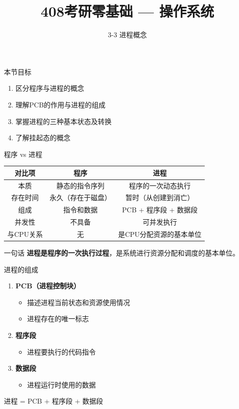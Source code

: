 \documentclass[10pt, aspectratio=169]{beamer}
\title{408考研零基础 --- 操作系统}
\subtitle{3-3 进程概念}
\author{}
\date{}
\begin{document}
\begin{frame}{本节目标}
    \begin{enumerate}
        \item 区分程序与进程的概念
        \item 理解PCB的作用与进程的组成
        \item 掌握进程的三种基本状态及转换
        \item 了解挂起态的概念
    \end{enumerate}
\end{frame}

\begin{frame}{程序 vs 进程}
    \begin{tabular}{|c|c|c|}
        \hline
        对比项 & 程序 & 进程 \\
        \hline
        本质 & 静态的指令序列 & 程序的一次动态执行 \\
        存在时间 & 永久（存在于磁盘） & 暂时（从创建到消亡） \\
        组成 & 指令和数据 & PCB + 程序段 + 数据段 \\
        并发性 & 不具备 & 可并发执行 \\
        与CPU关系 & 无 & 是CPU分配资源的基本单位 \\
        \hline
    \end{tabular}
    \vspace{0.5em}
    \begin{block}{一句话}
        \textbf{进程是程序的一次执行过程}，是系统进行资源分配和调度的基本单位。
    \end{block}
\end{frame}

\begin{frame}{进程的组成}
    \begin{enumerate}
        \item \textbf{PCB（进程控制块）}
        \begin{itemize}
            \item 描述进程当前状态和资源使用情况
            \item \textcolor{408orange}{进程存在的唯一标志}
        \end{itemize}
        \item \textbf{程序段}
        \begin{itemize}
            \item 进程要执行的代码指令
        \end{itemize}
        \item \textbf{数据段}
        \begin{itemize}
            \item 进程运行时使用的数据
        \end{itemize}
    \end{enumerate}
    \vspace{0.5em}
    \begin{center}
        进程 = \textcolor{408blue}{PCB} + \textcolor{408blue}{程序段} + \textcolor{408blue}{数据段}
    \end{center}
\end{frame}
\end{document}
